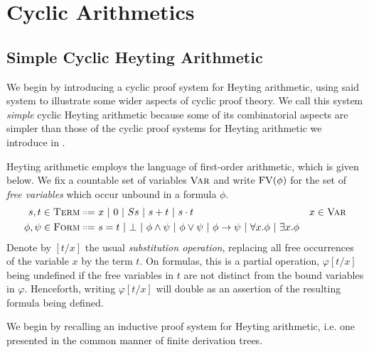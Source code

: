 
\chapter{Cyclic Arithmetics}
\label{chap:ca}

\section{Simple Cyclic Heyting Arithmetic}
\label{sec:cha}

We begin by introducing a cyclic proof system for Heyting arithmetic, using
said system to illustrate some wider aspects of cyclic proof theory. We call
this system \emph{simple} cyclic Heyting arithmetic because some of its
combinatorial aspects are simpler than those of the cyclic proof systems for
Heyting arithmetic we introduce in .

Heyting arithmetic employs the language of first-order arithmetic,
which is given below. We fix a countable set of variables $\textsc{Var}$ and write
$\mathrm{FV}(\phi)$ for the set of \emph{free variables} which occur unbound in a
formula $\phi$.
\begin{align*}
  s,t \in \term \langeq~& x ~|~ 0 ~|~ S s ~|~ s + t ~|~ s \cdot t  & x \in \var \\
  \phi, \psi \in \form \langeq~& s = t ~|~ \bot ~|~ \phi \wedge \psi ~|~ \phi \vee \psi ~|~ \phi \to \psi ~|~ \forall x.\phi ~|~ \exists x. \phi
\end{align*}
Denote by $[t / x]$ the usual \emph{substitution operation}, replacing all free
occurrences of the variable $x$ by the term $t$. On formulas, this is a partial
operation, $\varphi[t / x]$ being undefined if the free variables in $t$ are not
distinct from the bound variables in $\varphi$. Henceforth, writing $\varphi[t /
x]$ will double as an assertion of the resulting formula being defined.

We begin by recalling an inductive proof system for Heyting arithmetic, i.e. one
presented in the common manner of finite derivation trees.

